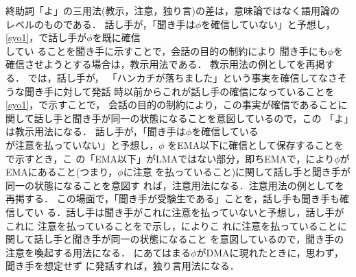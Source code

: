 終助詞「よ」の三用法(教示，注意，独り言)の差は，意味論ではなく語用論の
レベルのものである．  話し手が，「聞き手は\(\phi\)を確信していない」と予想し，
\ref{syo1}，で話し手が\(\phi\)を既に確信\\してい
ることを聞き手に示すことで，会話の目的の制約により
聞き手にも\(\phi\)を確信させようとする場合は，教示用法である．
教示用法の例としてを再掲する．
 \label{reteach}
では，話し手が，
「ハンカチが落ちました」という事実を確信してなさそうな聞き手に対して発話
時以前からこれが話し手の確信になっていることを
\ref{syo1}，で示すことで，
会話の目的の制約により，この事実が確信であることに
関して話し手と聞き手が同一の状態になることを意図しているので，この
「よ」は教示用法になる．
話し手が，「聞き手は\(\phi\)を確信している\\が注意を払っていない」と予想し，\(\phi\)
をEMA以下に確信として保存することをで示すとき，こ
の「EMA以下」がLMAではない部分，即ちEMAで，により\(\phi\)がEMAにあること(つまり，\(\phi\)に注意
を払っていること)に関して話し手と聞き手が同一の状態になることを意図す
れば，注意用法になる．注意用法の例としてを再掲する．
 \label{reremind}
この場面で，「聞き手が受験生である」ことを，話し手も聞き手も確信してい
る．話し手は聞き手がこれに注意を払っていないと予想し，話し手がこれに
注意を払っていることをで示し，によりこ
れに注意を払っていることに関して話し手と聞き手が同一の状態になること
を意図しているので，聞き手の注意を喚起する用法になる．
にあてはまる\(\phi\)がDMAに現れたときに，思わず，聞き手を想定せず
に発話すれば，独り言用法になる．

